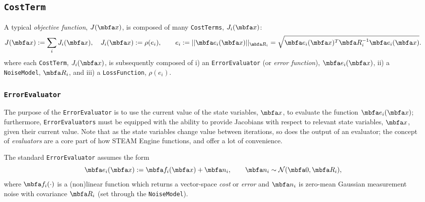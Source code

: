 \documentclass[10pt,letterpaper,fleqn,oneside]{article}
\newcommand{\code}[1]{\texttt{#1}}
\begin{document}
\subsection{\code{CostTerm}}
\label{sec:cost_term}

A typical \emph{objective function}, $J(\mbf{x})$, is composed of many \code{CostTerms}, $J_i(\mbf{x})$:
%
\begin{equation}
\label{eq:cost_term}
J(\mbf{x}) := \sum_i J_i(\mbf{x}), \quad J_i(\mbf{x}) := \rho(e_i), \qquad e_i := ||\mbf{e}_i(\mbf{x})||_{\mbf{R}_i} = \sqrt{\mbf{e}_i(\mbf{x})^T \mbf{R}_i^{-1} \mbf{e}_i(\mbf{x})}.
\end{equation}
%
where each \code{CostTerm}, $J_i(\mbf{x})$, is subsequently composed of i) an \code{ErrorEvaluator} (or \emph{error function}), $\mbf{e}_i(\mbf{x})$, ii) a \code{NoiseModel}, $\mbf{R}_i$, and iii) a \code{LossFunction}, $\rho(e_i)$.

\subsubsection{\code{ErrorEvaluator}}
\label{sec:err_eval}

The purpose of the \code{ErrorEvaluator} is to use the current value of the state variables, $\mbf{x}$, to evaluate the function $\mbf{e}_i(\mbf{x})$; furthermore, \code{ErrorEvaluators} must be equipped with the ability to provide Jacobians with respect to relevant state variables, $\mbf{x}$, given their current value.
Note that as the state variables change value between iterations, so does the output of an evaluator; the concept of \emph{evaluators} are a core part of how STEAM Engine functions, and offer a lot of convenience.

\noindent The standard \code{ErrorEvaluator} assumes the form
%
\begin{equation}
\mbf{e}_i(\mbf{x}) := \mbf{f}_i(\mbf{x}) + \mbf{n}_i, \qquad \mbf{n}_i \sim \N(\mbf{0}, \mbf{R}_i),
\end{equation}
%
where $\mbf{f}_i(\cdot)$ is a (non)linear function which returns a vector-space \emph{cost} or \emph{error} and $\mbf{n}_i$ is zero-mean Gaussian measurement noise with covariance $\mbf{R}_i$ (set through the \code{NoiseModel}).

\end{document}
